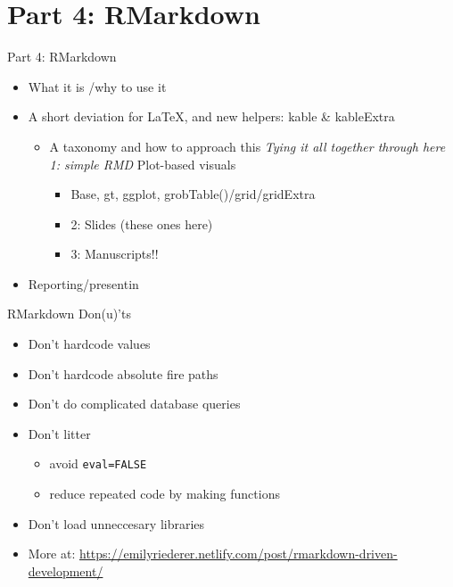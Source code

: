 \documentclass[ignorenonframetext,]{beamer}
\providecommand{\tightlist}{%
  \setlength{\itemsep}{0pt}\setlength{\parskip}{0pt}}
\begin{document}
\hypertarget{part-4-rmarkdown}{%
\section{Part 4: RMarkdown}\label{part-4-rmarkdown}}

\begin{frame}{Part 4: RMarkdown}
\protect\hypertarget{part-4-rmarkdown-1}{}

\begin{itemize}
\tightlist
\item
  What it is /why to use it
\item
  A short deviation for LaTeX, and new helpers: kable \& kableExtra

  \begin{itemize}
  \tightlist
  \item
    A taxonomy and how to approach this \emph{Tying it all together
    through here 1: simple RMD }Plot-based visuals

    \begin{itemize}
    \tightlist
    \item
      Base, gt, ggplot, grobTable()/grid/gridExtra
    \item
      2: Slides (these ones here)
    \item
      3: Manuscripts!!
    \end{itemize}
  \end{itemize}
\item
  Reporting/presentin
\end{itemize}

\end{frame}

\begin{frame}[fragile]{RMarkdown Don(u)'ts}
\protect\hypertarget{rmarkdown-donuts}{}

\begin{itemize}
\tightlist
\item
  Don't hardcode values
\item
  Don't hardcode absolute fire paths
\item
  Don't do complicated database queries
\item
  Don't litter

  \begin{itemize}
  \tightlist
  \item
    avoid \texttt{eval=FALSE}
  \item
    reduce repeated code by making functions
  \end{itemize}
\item
  Don't load unneccesary libraries
\item
  More at:
  \url{https://emilyriederer.netlify.com/post/rmarkdown-driven-development/}
\end{itemize}

\end{frame}
\end{document}
